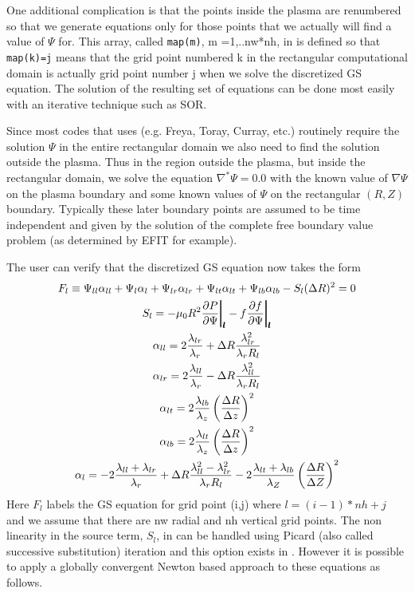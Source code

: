 One additional complication is that the points inside the plasma are renumbered
so that we generate equations only for those points that we actually will  find
a value of $\Psi$ for. This array, called \texttt{map(m)}, m =1,..nw*nh, in \ot
is defined so that \texttt{map(k)=j} means that the grid point numbered k in the
rectangular computational domain is actually grid point number j when we solve
the discretized GS equation. The solution of the resulting set of equations can
be done most easily with an iterative technique such as SOR.

Since most codes that \ot uses (e.g. Freya, Toray, Curray, etc.) routinely
require the solution $\Psi$ in the entire rectangular domain we also need to
find the solution outside the plasma. Thus in the region outside the plasma, but
inside the rectangular domain, we solve the equation ${\nabla}^{*} \Psi =0.0 $
with the known value of $\nabla\Psi$ on the plasma boundary and some known
values of $\Psi $ on the rectangular $(R,Z)$ boundary. Typically these later
boundary points are assumed to be time independent and given by the solution of
the complete free boundary value problem (as determined by EFIT for example).

The user can verify that the discretized GS equation now takes the
form
\begin{subequations}\label{mhd:eq}
 \begin{gather}
  F_l \equiv \Psi_{ll}\alpha_{ll} +\Psi_l\alpha_l +\Psi_{lr} \alpha_{lr} +
   \Psi_{lt} \alpha_{lt} + \Psi_{lb}\alpha_{lb} -S_l(\Delta R)^2 = 0  
   \label{mhd:eq1}\\
  S_l = -\mu_0R^2\frac{\partial{ P}}{\partial{ \Psi}}\pmb{\bigg \vert_l}
   -f\frac{\partial{ f}}{\partial{ \Psi}}\pmb{\bigg \vert_l}
   \label{mhd:eq2}     \\
  \alpha_{ll} =2\frac{\lambda_{lr}}{\lambda_r} + \Delta R
   \frac{\lambda_{lr}^2}{\lambda_r R_l}
   \label{mhd:eq3}\\
  \alpha_{lr} = 2\frac{\lambda_{ll}}{\lambda_r} - \Delta R
   \frac{\lambda_{ll}^2}{\lambda_r R_l} 
   \label{mhd:eq4}\\
  \alpha_{lt} = 2\frac{\lambda_{lb}}{\lambda_z}
   \left (\frac{\Delta R}{\Delta z} \right)^2
   \label{mhd:eq5}\\
  \alpha_{lb} = 2\frac{\lambda_{lt}}{\lambda_z}
   \left (\frac{\Delta R  }{\Delta z} \right)^2
   \label{mhd:eq6}\\
  \alpha_l = -2\frac{\lambda_{ll}+\lambda_{lr}}{\lambda_r} + \Delta R
   \frac{\lambda_{ll}^2-\lambda_{lr}^2}{\lambda_r R_l} 
   -2\frac{\lambda_{lt}+\lambda_{lb}}{\lambda_Z}
   \left( \frac{\Delta R}{\Delta Z} \right)^2
   \label{mhd:eq7}
 \end{gather}
\end{subequations}
Here $F_l$ labels the GS equation for grid point (i,j) where $l=(i-1)*nh+ j $
and we assume that there are nw radial and nh vertical grid points. The non
linearity in the source term, $S_l$, in  can be handled
using Picard (also called successive substitution) iteration and this option
exists in \ot. However it is possible to apply a globally convergent Newton
based  approach to these equations as follows.

